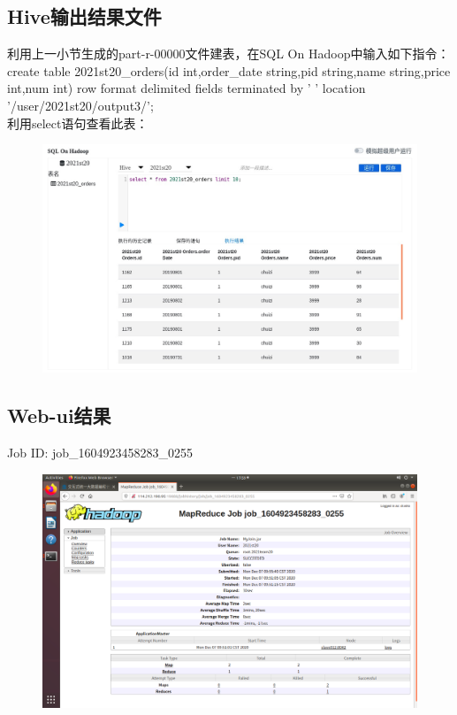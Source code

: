 \documentclass{article}
\begin{document}
\subsection{Hive输出结果文件}
利用上一小节生成的part-r-00000文件建表，在SQL On Hadoop中输入如下指令：\\
 create table 2021st20\_orders(id int,order\_date string,pid string,name string,price int,num int) row format delimited fields terminated by '  ' location '/user/2021st20/output3/'; \\
 利用select语句查看此表：
 \begin{figure}[H]
 	\centering
 	\includegraphics[scale=0.25]{hive.jpg}
 \end{figure}
 
\subsection{Web-ui结果}
Job ID: job\_1604923458283\_0255 

 \begin{figure}[H]
	\centering
	\includegraphics[scale=0.2]{webui.png}
\end{figure}
\end{document}
